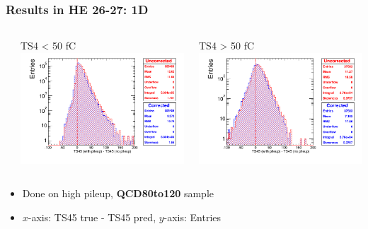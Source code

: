\documentclass[bigger]{beamer}
\providecommand{\alert}[1]{\textbf{#1}}
\begin{document}
\begin{frame}
\frametitle{Results in HE 26-27: 1D}
\label{sec-3-3-19}
\begin{columns} %
\label{sec-3-3-19-1}
\begin{column}{0.55\textwidth}
\label{sec-3-3-19-1-1}

\centering
TS4 < 50 fC
\includegraphics[width=\textwidth]{fig/correction_comparison_1D_sample80to120_under50_ring4.png}
\end{column}
\begin{column}{0.55\textwidth}
\label{sec-3-3-19-1-2}

\centering
TS4 > 50 fC
\includegraphics[width=\textwidth]{fig/correction_comparison_1D_sample80to120_over50_ring4.png}
\end{column}
\end{columns}
\label{sec-3-3-19-2}
\begin{itemize}

\item Done on high pileup, \alert{QCD80to120} sample
\label{sec-3-3-19-2-1}%

\item $x$-axis: TS45 true - TS45 pred, $y$-axis: Entries
\label{sec-3-3-19-2-2}%
\end{itemize} %
\end{frame}
\end{document}
